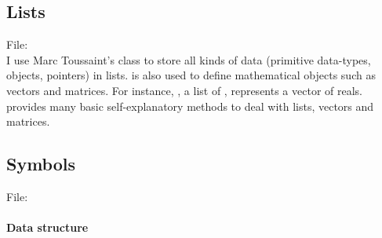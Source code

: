 \documentclass[10pt,twoside,twocolumn,fleqn]{article}
\begin{document}

\subsection{Lists}

File: \\

I use Marc Toussaint's  class to store all kinds of data (primitive
data-types, objects, pointers) in lists.  is also used to
define mathematical objects such as vectors and matrices. For
instance, ,  a list of , represents a
vector of reals.  provides many basic self-explanatory methods
to deal with lists, vectors and matrices.



\subsection{Symbols}

File: \\

\paragraph{Data structure}
\end{document}
